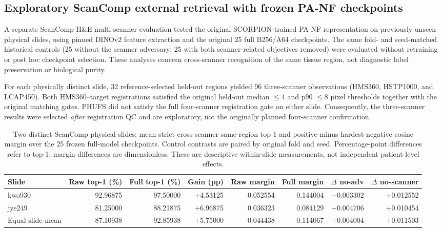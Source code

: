 \subsection{Exploratory ScanComp external retrieval with frozen PA-NF checkpoints}
\label{sec:scancomp_external}

A separate ScanComp H\&E multi-scanner evaluation tested the original SCORPION-trained PA-NF representation on previously unseen physical slides, using pinned DINOv2 feature extraction and the original 25 full B256/A64 checkpoints. The same fold- and seed-matched historical controls (25 without the scanner adversary; 25 with both scanner-related objectives removed) were evaluated without retraining or post hoc checkpoint selection. These analyses concern cross-scanner recognition of the same tissue region, not diagnostic label preservation or biological purity.

For each physically distinct slide, 32 reference-selected held-out regions yielded 96 three-scanner observations (HMS360, HSTP1000, and LCAP450). Both HMS360--target registrations satisfied the original held-out median $\leq4$ and p90 $\leq8$ pixel thresholds together with the original matching gates. PHUFS did not satisfy the full four-scanner registration gate on either slide. Consequently, the three-scanner results were selected \emph{after} registration QC and are exploratory, not the originally planned four-scanner confirmation.

\begin{table}[t]
\centering
\caption{Two distinct ScanComp physical slides: mean strict cross-scanner same-region top-1 and positive-minus-hardest-negative cosine margin over the 25 frozen full-model checkpoints. Control contrasts are paired by original fold and seed. Percentage-point differences refer to top-1; margin differences are dimensionless. These are descriptive within-slide measurements, not independent patient-level effects.}
\label{tab:scancomp_external_retrieval}
\small
\setlength{\tabcolsep}{3pt}
\begin{tabular}{lrrrrrrr}
\toprule
Slide & Raw top-1 (\%) & Full top-1 (\%) & Gain (pp) & Raw margin & Full margin & $\Delta$ no-adv & $\Delta$ no-scanner \\
\midrule
kwo930 & 92.96875 & 97.50000 & +4.53125 & 0.052554 & 0.144004 & +0.003302 & +0.012552 \\
jye249 & 81.25000 & 88.21875 & +6.96875 & 0.036323 & 0.084129 & +0.004706 & +0.010454 \\
\midrule
Equal-slide mean & 87.10938 & 92.85938 & +5.75000 & 0.044438 & 0.114067 & +0.004004 & +0.011503 \\
\bottomrule
\end{tabular}
\end{table}

